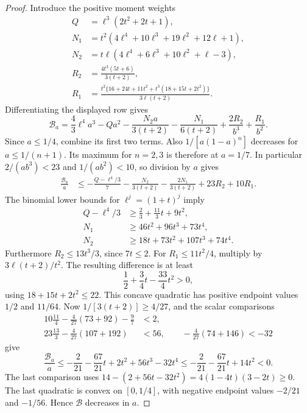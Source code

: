 \begin{proof}
Introduce the positive moment weights
\begin{align*}
 Q&=\ell^3(2t^2+2t+1),\\
 N_1&=t^2(4\ell^4+10\ell^3+19\ell^2+12\ell+1),\\
 N_2&=t\ell(4\ell^4+6\ell^3+10\ell^2+\ell-3),\\
 R_2&=\frac{4t^3(5t+6)}{3(t+2)},\\
 R_1&=\frac{t^2\{16+24t+11t^2+t^3(18+15t+2t^2)\}}
                  {3\ell(t+2)}.
\end{align*}
Differentiating the displayed row gives
\[
 \mathcal B_a=\frac43\ell^4a^3-Qa^2
  -\frac{N_2a}{3(t+2)}-\frac{N_1}{6(t+2)}
  +\frac{2R_2}{b^3}+\frac{R_1}{b^2}.
\]
Since $a\leq1/4$, combine its first two terms. Also
$1/[a(1-a)^n]$ decreases for $a\leq1/(n+1)$. Its maximum for
$n=2,3$ is therefore at $a=1/7$. In particular
$2/(ab^3)<23$ and $1/(ab^2)<10$, so division by $a$ gives
\begin{align*}
 \frac{\mathcal B_a}a
 &\leq-\frac{Q-\ell^4/3}7-\frac{N_2}{3(t+2)}
       -\frac{2N_1}{3(t+2)}
       +23R_2+10R_1.
\end{align*}
The binomial lower bounds for $\ell^j=(1+t)^j$ imply
\begin{align*}
 Q-\ell^4/3&\geq\frac23+\frac{11}3t+9t^2,\\
 N_1&\geq46t^2+96t^3+73t^4,\\
 N_2&\geq18t+73t^2+107t^3+74t^4.
\end{align*}
Furthermore $R_2\leq13t^3/3$, since $7t\leq2$.
For $R_1\leq11t^2/4$, multiply by $3\ell(t+2)/t^2$.
The resulting difference is at least
\[
 \frac12+\frac34t-\frac{33}4t^2>0,
\]
using $18+15t+2t^2\leq22$. This concave quadratic has positive
endpoint values $1/2$ and $11/64$.
Now $1/[3(t+2)]\geq4/27$, and the scalar comparisons
\begin{align*}
 10\frac{11}4-\frac4{27}(73+92)-\frac97&<2,\\
 23\frac{13}3-\frac4{27}(107+192)&<56,\qquad
 -\frac4{27}(74+146)<-32
\end{align*}
give
\[
 \frac{\mathcal B_a}a
 \leq-\frac2{21}-\frac{67}{21}t+2t^2+56t^3-32t^4
 \leq-\frac2{21}-\frac{67}{21}t+14t^2<0.
\]
The last comparison uses
$14-(2+56t-32t^2)=4(1-4t)(3-2t)\geq0$.
The last quadratic is convex on $[0,1/4]$, with negative endpoint
values $-2/21$ and $-1/56$. Hence $\mathcal B$ decreases in $a$.


\end{proof}
